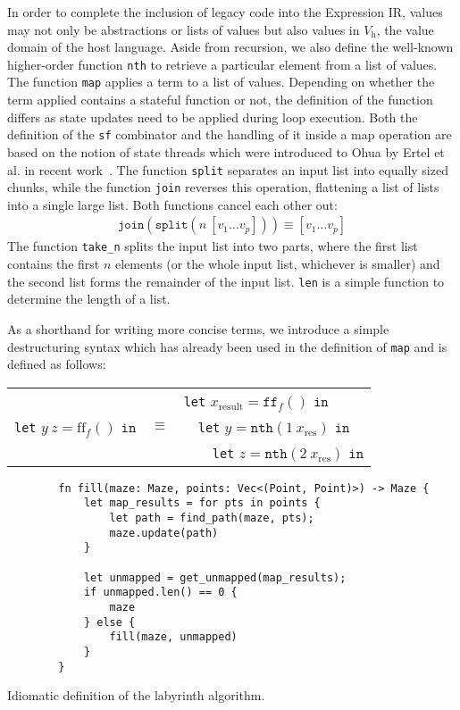 In order to complete the inclusion of legacy code into the Expression IR, values may not only be abstractions or lists of values but also values in $V_\text{h}$, the value domain of the host language.
Aside from recursion, we also define the well-known higher-order function \texttt{nth} to retrieve a particular element from a list of values.
The function \texttt{map} applies a term to a list of values.
Depending on whether the term applied contains a stateful function or not, the definition of the function differs as state updates need to be applied during loop execution.
Both the definition of the \texttt{sf} combinator and the handling of it inside a map operation are based on the notion of state threads which were introduced to Ohua by Ertel et al. in recent work~\cite{ertel2019stclang}.
The function \texttt{split} separates an input list into equally sized chunks, while the function \texttt{join} reverses this operation, flattening a list of lists into a single large list.
Both functions cancel each other out:
\begin{align*}
    \texttt{join}(\texttt{split}(n \ [v_1 \dots v_p])) \equiv [v_1 \dots v_p]
\end{align*}
The function \texttt{take\_n} splits the input list into two parts, where the first list contains the first $n$ elements (or the whole input list, whichever is smaller) and the second list forms the remainder of the input list.
\texttt{len} is a simple function to determine the length of a list.

As a shorthand for writing more concise terms, we introduce a simple destructuring syntax which has already been used in the definition of \texttt{map} and is defined as follows:
\begin{center}
    \begin{tabular}{l c l}
        && \texttt{let} $x_{\text{result}} = \texttt{ff}_f() \texttt{ in}$\\
        \texttt{let} $y\ z = \text{ff}_f() \texttt{ in}$ & $\equiv$ & \ \ \texttt{let} $y = \texttt{nth}(1\ x_{\text{res}}) \texttt{ in}$\\
        && \ \ \ \ \texttt{let} $z = \texttt{nth}(2\ x_{\text{res}}) \texttt{ in}$\\
    \end{tabular}
\end{center}

\begin{listing}[!b]
    \begin{verbatim}
        fn fill(maze: Maze, points: Vec<(Point, Point)>) -> Maze {
            let map_results = for pts in points {
                let path = find_path(maze, pts);
                maze.update(path)
            }

            let unmapped = get_unmapped(map_results);
            if unmapped.len() == 0 {
                maze
            } else {
                fill(maze, unmapped)
            }
        }
    \end{verbatim}
    \caption{Idiomatic definition of the labyrinth algorithm.}%
    \label{fig:transformations:idiomatic}
\end{listing}

